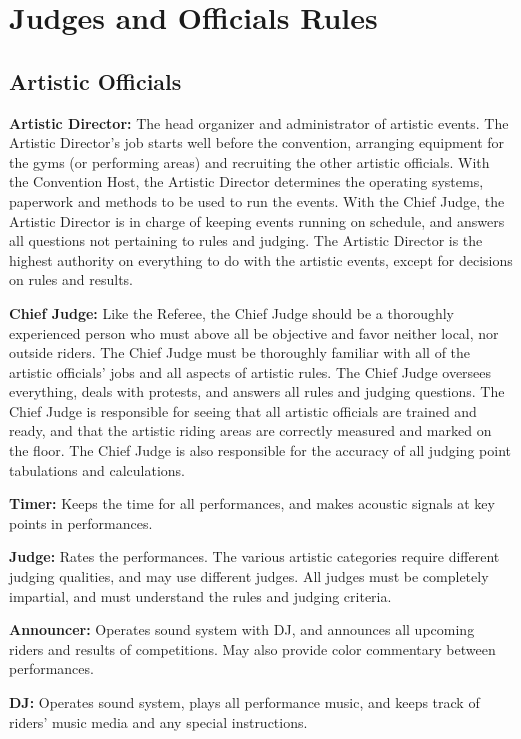 \chapter{Judges and Officials Rules}

\section{Artistic Officials}
\textbf{Artistic Director:} The head organizer and administrator of artistic events.
The Artistic Director's job starts well before the convention, arranging equipment for the gyms (or performing areas) and recruiting the other artistic officials.
With the Convention Host, the Artistic Director determines the operating systems, paperwork and methods to be used to run the events.
With the Chief Judge, the Artistic Director is in charge of keeping events running on schedule, and answers all questions not pertaining to rules and judging.
The Artistic Director is the highest authority on everything to do with the artistic events, except for decisions on rules and results.

\textbf{Chief Judge:} Like the Referee, the Chief Judge should be a thoroughly experienced person who must above all be objective and favor neither local, nor outside riders.
The Chief Judge must be thoroughly familiar with all of the artistic officials' jobs and all aspects of artistic rules.
The Chief Judge oversees everything, deals with protests, and answers all rules and judging questions.
The Chief Judge is responsible for seeing that all artistic officials are trained and ready, and that the artistic riding areas are correctly measured and marked on the floor.
The Chief Judge is also responsible for the accuracy of all judging point tabulations and calculations.

\textbf{Timer:} Keeps the time for all performances, and makes acoustic signals at key points in performances.

\textbf{Judge:} Rates the performances.
The various artistic categories require different judging qualities, and may use different judges.
All judges must be completely impartial, and must understand the rules and judging criteria.

\textbf{Announcer:} Operates sound system with DJ, and announces all upcoming riders and results of competitions.
May also provide color commentary between performances.

\textbf{DJ:} Operates sound system, plays all performance music, and keeps track of riders' music media and any special instructions.

